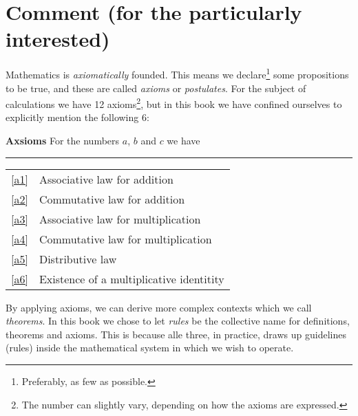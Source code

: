 



	
\section*{Comment (for the particularly interested) \label{Kommentar1}}
Mathematics is \textit{axiomatically} founded. This means we declare\footnote{Preferably, as few as possible.} some propositions to be true, and these are called \textit{axioms} or \textit{postulates}. For the subject of calculations we have 12 axioms\footnote{The number can slightly vary, depending on how the axioms are expressed.}, but in this book we have confined ourselves to explicitly mention the following 6:
\regv 

\begin{tcolorbox}[boxrule=0.3 mm,arc=0mm,colback=blue!5] {\large \textbf{Axsioms} \vspace{5 pt}}\newline
For the numbers $ a $, $ b $ and $ c $ we have
\rule{1\linewidth}{0.75bp}
\begin{center}
	\begin{tabular}{rl}
		\eqref{a1} &Associative law for addition\\
		\eqref{a2} & Commutative law for addition \\	
		\eqref{a3} & Associative law for multiplication \\
		\eqref{a4} & Commutative law for multiplication \\		
		\eqref{a5} & Distributive law\\	
		\eqref{a6} & Existence of a multiplicative identitity
	\end{tabular}
\end{center}
\end{tcolorbox}
\vsk
By applying axioms, we can derive more complex contexts which we call \textit{theorems}. In this book we chose to let \textsl{rules} be the collective name for definitions, theorems and axioms. This is because alle three, in practice, draws up guidelines (rules) inside the mathematical system in which we wish to operate.\vsk
